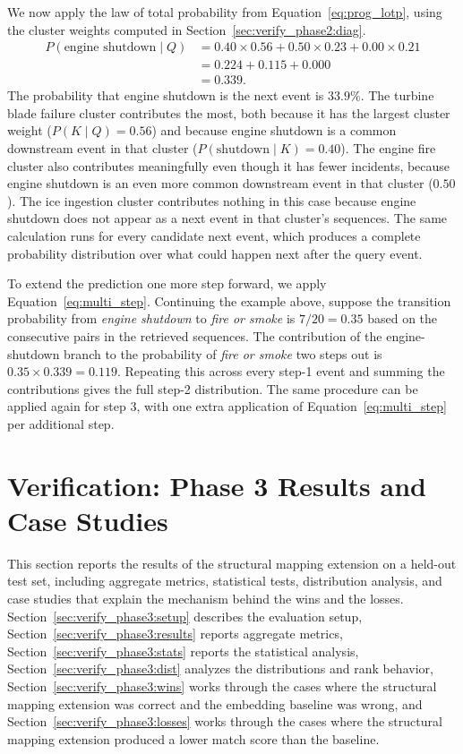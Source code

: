 \documentclass[11pt]{article}
\begin{document}
We now apply the law of total probability from Equation~\ref{eq:prog_lotp}, using the cluster weights computed in Section~\ref{sec:verify_phase2:diag}.
\begin{align*}
P(\text{engine shutdown} \mid Q) &= 0.40 \times 0.56 + 0.50 \times 0.23 + 0.00 \times 0.21 \\
&= 0.224 + 0.115 + 0.000 \\
&= 0.339.
\end{align*}
The probability that engine shutdown is the next event is $33.9\%$. The turbine blade failure cluster contributes the most, both because it has the largest cluster weight ($P(K \mid Q) = 0.56$) and because engine shutdown is a common downstream event in that cluster ($P(\text{shutdown} \mid K) = 0.40$). The engine fire cluster also contributes meaningfully even though it has fewer incidents, because engine shutdown is an even more common downstream event in that cluster ($0.50$). The ice ingestion cluster contributes nothing in this case because engine shutdown does not appear as a next event in that cluster's sequences. The same calculation runs for every candidate next event, which produces a complete probability distribution over what could happen next after the query event.

To extend the prediction one more step forward, we apply Equation~\ref{eq:multi_step}. Continuing the example above, suppose the transition probability from \emph{engine shutdown} to \emph{fire or smoke} is $7 / 20 = 0.35$ based on the consecutive pairs in the retrieved sequences. The contribution of the engine-shutdown branch to the probability of \emph{fire or smoke} two steps out is $0.35 \times 0.339 = 0.119$. Repeating this across every step-1 event and summing the contributions gives the full step-2 distribution. The same procedure can be applied again for step 3, with one extra application of Equation~\ref{eq:multi_step} per additional step.

\section{Verification: Phase 3 Results and Case Studies}
\label{sec:verify_phase3}

This section reports the results of the structural mapping extension on a held-out test set, including aggregate metrics, statistical tests, distribution analysis, and case studies that explain the mechanism behind the wins and the losses. Section~\ref{sec:verify_phase3:setup} describes the evaluation setup, Section~\ref{sec:verify_phase3:results} reports aggregate metrics, Section~\ref{sec:verify_phase3:stats} reports the statistical analysis, Section~\ref{sec:verify_phase3:dist} analyzes the distributions and rank behavior, Section~\ref{sec:verify_phase3:wins} works through the cases where the structural mapping extension was correct and the embedding baseline was wrong, and Section~\ref{sec:verify_phase3:losses} works through the cases where the structural mapping extension produced a lower match score than the baseline.
\end{document}
